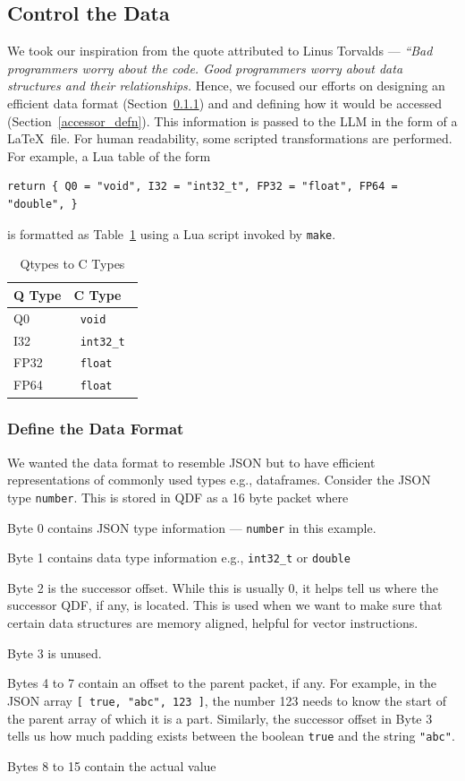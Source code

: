 \documentclass[letterpaper,12pt]{article}
\begin{document}
\subsection{Control the Data}
We took our inspiration from the quote attributed to Linus Torvalds --- 
{\em ``Bad programmers worry
about the code. Good programmers worry about data structures and their
relationships.} Hence, we focused our efforts on designing an efficient data
format  (Section~\ref{data_format_defn}) and 
and defining how it would be accessed (Section~\ref{accessor_defn}).
This information is passed to the LLM in the form of a \LaTeX\ file. 
For human readability, some scripted transformations are performed. For example,
a Lua table of the form 
\begin{verbatim}
return { Q0 = "void", I32 = "int32_t", FP32 = "float", FP64 = "double", }
\end{verbatim}
is formatted as Table~\ref{sample_q2c} using a Lua script invoked by {\tt make}.
\begin{table}[hb]
\centering
\begin{tabular}{|l|l|} \hline \hline 
{\bf Q Type } & {\bf C Type } \\ \hline \hline
 Q0 & \verb+ void + \\ \hline
 I32 & \verb+ int32_t + \\ \hline
 FP32 & \verb+ float + \\ \hline
 FP64 & \verb+ float + \\ \hline
\hline
\end{tabular}
\caption{Qtypes to C Types}
\label{sample_q2c}
\end{table}

\subsubsection{Define the Data Format}
\label{data_format_defn}

We wanted the data format to resemble JSON but to have efficient 
representations of commonly used types e.g., dataframes. Consider the JSON type
{\tt number}. This is stored in QDF as a 16 byte packet where
\be
\item Byte 0 contains JSON type information --- {\tt number} in this example.
\item Byte 1 contains data type information e.g., {\tt int32\_t} or {\tt double}
\item Byte 2 is the successor offset. While this is usually 0, it helps tell us
  where the successor QDF, if any, is located. This is used when we want to
  make sure that certain data structures are memory aligned, helpful for vector
  instructions.
\item Byte 3 is unused.
\item Bytes 4 to 7 contain an offset to the parent packet, if any. 
  For example,
  in the JSON array \verb+[ true, "abc", 123 ]+, the number 123 needs to 
  know the start of the parent array of which it is a part. Similarly, the
  successor offset in Byte 3 tells us how much padding exists between the
  boolean {\tt true} and the string {\tt "abc"}.
\item Bytes 8 to 15 contain the actual value
  \ee
\end{document}
